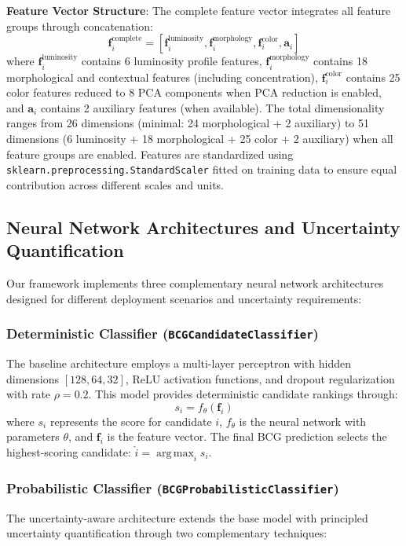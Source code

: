 \documentclass[twocolumn,10pt]{aastex631}
\DeclareMathOperator*{\argmax}{arg\,max}
\begin{document}
\textbf{Feature Vector Structure}: The complete feature vector integrates all feature groups through concatenation:
\begin{equation}
\mathbf{f}_i^{\text{complete}} = [\mathbf{f}_i^{\text{luminosity}}, \mathbf{f}_i^{\text{morphology}}, \mathbf{f}_i^{\text{color}}, \mathbf{a}_i]
\end{equation}
where $\mathbf{f}_i^{\text{luminosity}}$ contains 6 luminosity profile features, $\mathbf{f}_i^{\text{morphology}}$ contains 18 morphological and contextual features (including concentration), $\mathbf{f}_i^{\text{color}}$ contains 25 color features reduced to 8 PCA components when PCA reduction is enabled, and $\mathbf{a}_i$ contains 2 auxiliary features (when available). The total dimensionality ranges from 26 dimensions (minimal: 24 morphological + 2 auxiliary) to 51 dimensions (6 luminosity + 18 morphological + 25 color + 2 auxiliary) when all feature groups are enabled. Features are standardized using \texttt{sklearn.preprocessing.StandardScaler} fitted on training data to ensure equal contribution across different scales and units.

\subsection{Neural Network Architectures and Uncertainty Quantification}

Our framework implements three complementary neural network architectures designed for different deployment scenarios and uncertainty requirements:

\subsubsection{Deterministic Classifier (\texttt{BCGCandidateClassifier})}
The baseline architecture employs a multi-layer perceptron with hidden dimensions $[128, 64, 32]$, ReLU activation functions, and dropout regularization with rate $\rho = 0.2$. This model provides deterministic candidate rankings through:
\begin{equation}
s_i = f_{\theta}(\mathbf{f}_i)
\end{equation}
where $s_i$ represents the score for candidate $i$, $f_{\theta}$ is the neural network with parameters $\theta$, and $\mathbf{f}_i$ is the feature vector. The final BCG prediction selects the highest-scoring candidate: $\hat{i} = \argmax_i s_i$.

\subsubsection{Probabilistic Classifier (\texttt{BCGProbabilisticClassifier})}
The uncertainty-aware architecture extends the base model with principled uncertainty quantification through two complementary techniques:
\end{document}
